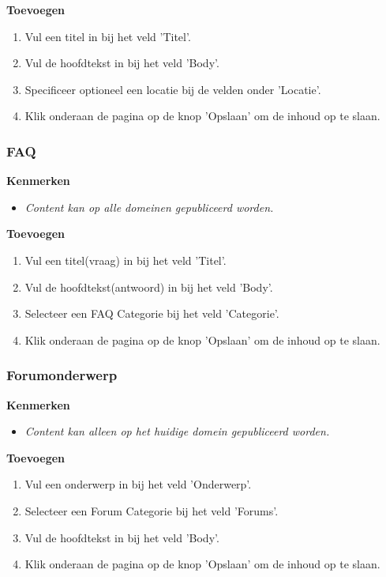 \textbf{Toevoegen}

\begin{enumerate}
\item Vul een titel in bij het veld 'Titel'.
\item Vul de hoofdtekst in bij het veld 'Body'.
\item Specificeer optioneel een locatie bij de velden onder 'Locatie'.
\item Klik onderaan de pagina op de knop 'Opslaan' om de inhoud op te slaan.
\end{enumerate}

\subsubsection{FAQ}\label{faq}

\textbf{Kenmerken}

\begin{itemize}
\item \emph{Content kan op alle domeinen gepubliceerd worden.}
\end{itemize}

\textbf{Toevoegen}

\begin{enumerate}
\item Vul een titel(vraag) in bij het veld 'Titel'.
\item Vul de hoofdtekst(antwoord) in bij het veld 'Body'.
\item Selecteer een FAQ Categorie bij het veld 'Categorie'.
\item Klik onderaan de pagina op de knop 'Opslaan' om de inhoud op te slaan.
\end{enumerate}

\subsubsection{Forumonderwerp}\label{forumonderwerp}

\textbf{Kenmerken}

\begin{itemize}
\item \emph{Content kan alleen op het huidige domein gepubliceerd worden.}
\end{itemize}

\textbf{Toevoegen}

\begin{enumerate}
\item Vul een onderwerp in bij het veld 'Onderwerp'.
\item Selecteer een Forum Categorie bij het veld 'Forums'.
\item Vul de hoofdtekst in bij het veld 'Body'.
\item Klik onderaan de pagina op de knop 'Opslaan' om de inhoud op te slaan.
\end{enumerate}

